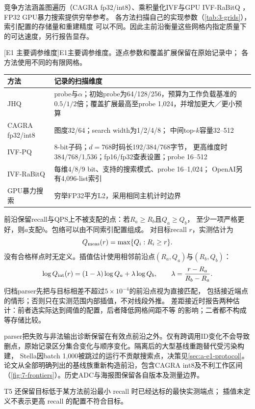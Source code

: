 竞争方法涵盖图遍历（CAGRA fp32/int8）、乘积量化IVF与GPU IVF-RaBitQ
\cite{cagra,pq,ivfrabitq}，FP32 GPU暴力搜索提供穷举参考。
各方法扫描自己的实现参数（\cref{tab:3-grids}），索引配置的存储量和重建精度
可以不同。因此主前沿衡量这些网格内指定质量下的可达速度，另行报告显存。

\par\medskip\noindent\begin{minipage}{\linewidth}
\centering\captionsetup{hypcap=false}
[E1 主要调参维度]{E1主要调参维度。逐点参数和覆盖扩展保留在原始记录中；
各方法使用不同的有限网格。}
\label{tab:3-grids}
\footnotesize\setlength{\tabcolsep}{4pt}
\begin{tabularx}{\linewidth}{@{}p{.22\linewidth}X@{}}
\toprule
方法 & 记录的扫描维度 \\
\midrule
JHQ & probe与$\alpha$；初始probe为64/128/256，预算为工作负载基准的
$0.5/1/2$倍；覆盖扩展最高至probe 1,024，并增加更大／更小预算 \\
CAGRA fp32/int8 & 图度32/64；search width为1/2/4/8；
中间top-$k$容量32--512 \\
IVF-PQ & 8-bit子码；$d=768$时码长192/384/768字节，
更高维度时384/768/1,536；fp16/fp32查表设置；probe 16--512 \\
IVF-RaBitQ & 每维4/8/9 bit、支持的搜索模式、probe 16--1,024；
OpenAI另有4,096-list索引 \\
GPU暴力搜索 & 穷举FP32平方L2，采用相同主机计时边界 \\
\bottomrule
\end{tabularx}
\end{minipage}\par\medskip

前沿保留recall与QPS上不被支配的点：若$R_a\geq R_b$且$Q_a\geq Q_b$，
至少一项严格更好，则$a$支配$b$。包络可以由不同索引配置组成。
对目标recall $r$，实测估计为
\begin{equation}
Q_{\rm meas}(r)=\max\{Q_i:R_i\geq r\}.
\label{eq:3-measured-frontier}
\end{equation}
没有合格样点时无定义。插值估计使用相邻前沿点$(R_a,Q_a)$与$(R_b,Q_b)$：
\begin{equation}
\log Q_{\rm int}(r)=(1-\lambda)\log Q_a+\lambda\log Q_b,
\qquad \lambda=\frac{r-R_a}{R_b-R_a}.
\label{eq:3-interpolated-frontier}
\end{equation}
归档parser先把与目标相差不超过$5\times10^{-4}$的前沿点视为直接匹配，
包括接近端点的情形；否则只在实测范围内部插值，不对线段外推。
差距接近时报告两种估计：前者选实际达到阈值的配置，后者降低网格间距不等
的影响；二者都不构成等存储比较。

parser把失败与非法输出诊断保留在有效点前沿之外。仅有跨调用ID变化不会导致
删点，原始记录区分集合变化与顺序变化。隔离后的大型基线重跑替代受污染构建，
Stella因batch 1,000被跳过的运行不贡献搜索点，决策见\cref{sec:a-e1-protocol}。
论文从全部明确列出的基线族重新构造前沿，包含CAGRA int8及不利工作区间
（\cref{fig:7-frontiers}）。历史ADC与海报图保留各自版本及测量边界。

T5 还保留目标低于某方法前沿最小 recall 时已经达标的最快实测端点；
插值未定义不表示更高 recall 的配置不符合目标。

